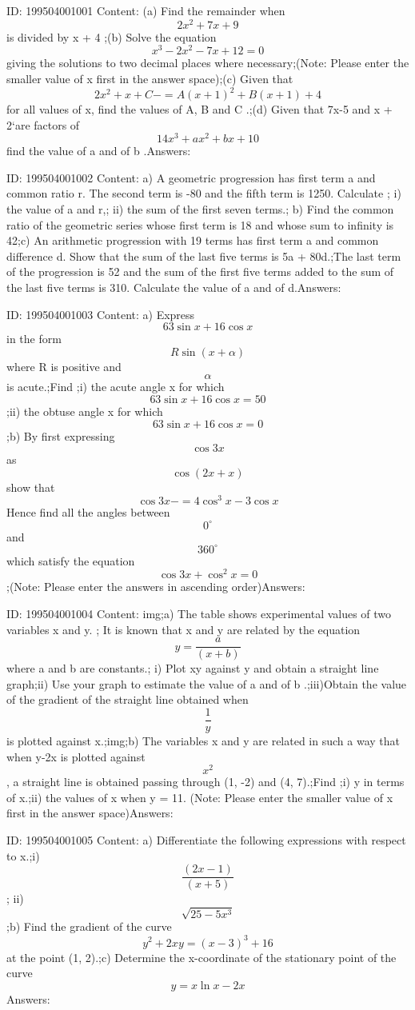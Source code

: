 \documentclass{article}
\begin{document}
ID: 199504001001
Content:
(a)	Find the remainder when \[2x^2+7x+9\] is divided by x + 4 ;(b)	Solve the equation \[x^3-2x^2-7x+12=0\] giving the solutions to two decimal places where necessary;(Note: Please enter the smaller value of x first in the answer space);(c)	Given that \[2x^2+x+C -= A(x+1)^2+B(x+1)+4 \] for all values of x, find the values of A, B and C .;(d)	Given that 7x-5 and x + 2`are factors of \[14x^3+ax^2+bx+10\] find the value of a and of b .Answers:

ID: 199504001002
Content:
a) A geometric progression has first term a and common ratio r. The second term is -80 and the fifth term is 1250. Calculate ; i) the value of a and r,; ii) the sum of the first seven terms.; b) Find the common ratio of the geometric series whose first term is 18 and whose sum to infinity is 42;c) An arithmetic progression with 19 terms has first term a and common difference d. Show that the sum of the last five terms is 5a + 80d.;The last term of the progression is 52 and the sum of the first five terms added to the sum of the last five terms is 310. Calculate the value of a and of d.Answers:

ID: 199504001003
Content:
a) Express \[63\sin x+16\cos x\]in the form \[R\sin \left ( x+\alpha  \right )\] where R is positive and \[\alpha\] is acute.;Find ;i)	the acute angle x for which $$63\sin x+16\cos x =50$$;ii)	the obtuse angle x for which \[63\sin x+16\cos x=0\];b) By first expressing \[\cos 3x\]as \[\cos \left ( 2x+x \right )\]show that \[\cos 3x -=4\cos ^{3}x-3\cos x\]Hence find all the angles between \[0^{\circ}\]and \[360^{\circ}\]which satisfy the equation \[\cos 3x +\cos ^{2}x=0\];(Note: Please enter the answers in ascending order)Answers:

ID: 199504001004
Content:
img;a) The table shows experimental values of two variables x and y. ; It is known that x and y are related by the equation \[y=\frac{a}{\left ( x+b \right )}\]where a and b are constants.; i) Plot xy against y and obtain a straight line graph;ii) Use your graph to estimate the value of a and of b .;iii)Obtain the value of the gradient of the straight line obtained when \[\frac{1}{y}\]is plotted against x.;img;b) The variables x and y are related in such a way that when y-2x is plotted against \[x^{2}\], a straight line is obtained passing through (1, -2) and (4, 7).;Find ;i)	y in terms of x.;ii)	the values of x when y = 11. (Note: Please enter the smaller value of x first in the answer space)Answers:

ID: 199504001005
Content:
a) Differentiate the following expressions with respect to x.;i)	\[\frac{\left ( 2x-1 \right )}{\left ( x+5 \right )}\]; ii)	\[\sqrt{25-5x^3}\];b) Find the gradient of the curve  \[y^2+2xy=(x-3)^3+16\] at the point (1, 2).;c) Determine the x-coordinate of the stationary point of the curve \[y=x\ln x-2x\]Answers:
\end{document}

